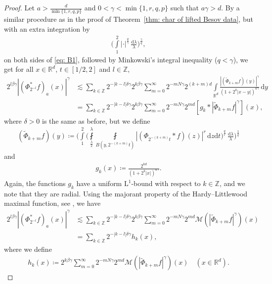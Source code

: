 \documentclass[11pt, leqno,parskip=half]{amsart}
\theoremstyle{definition}
\newcommand{\IR}{\mathbb{R}}
\newcommand{\IZ}{\mathbb{Z}}
\newcommand{\cM}{\mathcal{M}}
\renewcommand{\L}{\mathrm{L}}
\renewcommand{\d}{\mathrm{d}}
\numberwithin{equation}{section}
\begin{document}
\begin{proof}
Let $a>\frac{d}{ \min\{1,r,q,p\}}$ and $0<\gamma< \min\{1,r,q,p\}$ such that $a\gamma >d$. By a similar procedure as in the proof of Theorem~\ref{thm: char of lifted Besov data}, but with an extra integration by
\begin{align*}
    \bigg(\int\limits_{1}^2  |\cdot |^\frac{q}{\gamma}\,\frac{\d \lambda }{\lambda}\bigg)^\frac{\gamma}{q},
\end{align*}
 on both sides of \eqref{eq: B1}, followed by Minkowski's integral inequality ($q<\gamma$), we get for all $x\in \IR^d$, $t\in [1/2,2]$ and $l\in \IZ$,
\begin{align}
\label{eq: help align :)}
    2^{l\beta\gamma}|(\Phi_{2^{-l}}^*f)_a(x)|^\gamma &\lesssim \sum\limits_{k\in\IZ} 2^{-|k-l|\delta\gamma} 2^{k\beta\gamma} \sum\limits_{m=0}^\infty 2^{-mN\gamma} 2^{(k+m)d}\int\limits_{\IR^d} \frac{|(\widetilde{\Phi}_{k+m}f)(y)|^\gamma}{(1+2^k|x-y|)^{a\gamma}}\,\d y \nonumber\\
    &=\sum\limits_{k\in\IZ} 2^{-|k-l|\delta\gamma} 2^{k\beta\gamma} \sum\limits_{m=0}^\infty 2^{-mN\gamma} 2^{md} [g_k\ast |\widetilde{\Phi}_{k+m}f|^\gamma](x),
\end{align}
where $\delta>0$ is the same as before, but we define
\begin{align*}
    (\widetilde{\Phi}_{k+m}f)(y) \coloneqq  \bigg(\int\limits_{1}^2\bigg(\fint\limits_{\frac{\lambda}{2}}^\lambda \fint\limits_{B(y,2^{-(k+m)}t)} |(\Phi_{2^{-(k+m)}t}\ast f)(z) |^r\,\d z \d t\bigg)^\frac{q}{r}\,\frac{\d \lambda }{\lambda}\bigg)^\frac{1}{q}
\end{align*}
and
\begin{align*}
    g_k(x) \coloneqq \frac{2^{kd}}{(1+2^k|x|)^{a\gamma}}.
\end{align*}
Again, the functions $g_k$ have a uniform $\L^1$-bound with respect to $k\in\IZ$, and we note that they are radial. Using the majorant property of the Hardy--Littlewood maximal function, see \cite[Thm.\@ 2.1.10]{Grafakos}, we have
\begin{align*}
    2^{l\beta\gamma}|(\Phi_{2^{-l}}^*f)_a(x)|^\gamma &\lesssim\sum\limits_{k\in\IZ} 2^{-|k-l|\delta\gamma} 2^{k\beta\gamma} \sum\limits_{m=0}^\infty 2^{-mN\gamma} 2^{md} \cM( |\widetilde{\Phi}_{k+m}f|^\gamma)(x)\\
    &=\sum\limits_{k\in\IZ} 2^{-|k-l|\delta\gamma} h_k(x),
\end{align*}
where we define
\begin{align*}
    h_k(x) \coloneqq 2^{k\beta\gamma} \sum\limits_{m=0}^\infty 2^{-mN\gamma} 2^{md} \cM( |\widetilde{\Phi}_{k+m}f|^\gamma)(x) \quad (x\in \IR^d).

\end{align*}
\end{proof}
\end{document}
